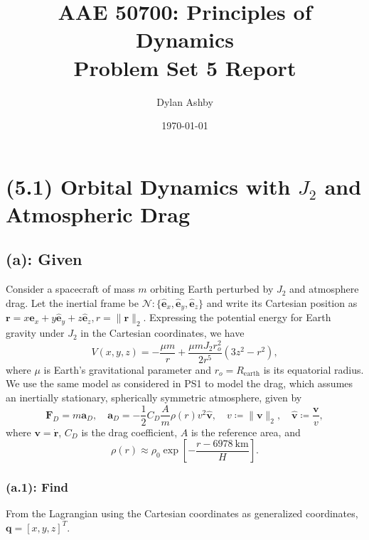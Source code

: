 \documentclass[titlepage]{article}
\title{AAE 50700: Principles of Dynamics\\ Problem Set 5 Report}
\author{Dylan Ashby}
\date{\today}
\begin{document}
\maketitle

\section*{(5.1) Orbital Dynamics with $J_2$ and Atmospheric Drag}

\subsection*{(a): Given}

Consider a spacecraft of mass $m$ orbiting Earth perturbed by $J_2$ and atmosphere drag. Let the inertial frame be $\mathcal{N}:\{\hat{\boldsymbol{e}}_x,\hat{\boldsymbol{e}}_y,\hat{\boldsymbol{e}}_z\}$ and write its Cartesian position as $\boldsymbol{r}=x\hat{\boldsymbol{e}}_x+y\hat{\boldsymbol{e}}_y+z\hat{\boldsymbol{e}}_z,r=\|\boldsymbol{r}\|_2$. Expressing the potential energy for Earth gravity under $J_2$ in the Cartesian coordinates, we have
\begin{equation}
	V(x,y,z)=-\frac{\mu m}{r}+\frac{\mu mJ_2r_o^2}{2r^5}\left(3z^2-r^2\right),
\end{equation}
where $\mu$ is Earth's gravitational parameter and $r_o=R_{\text{earth}}$ is its equatorial radius.\\

We use the same model as considered in PS1 to model the drag, which assumes an inertially stationary, spherically symmetric atmosphere, given by
\begin{equation}
	\boldsymbol{F}_D=m\boldsymbol{a}_D,\quad\boldsymbol{a}_D=-\frac{1}{2}C_D\frac{A}{m}\rho(r)v^2\hat{\boldsymbol{v}},\quad v\coloneqq\|\boldsymbol{v}\|_2,\quad\hat{\boldsymbol{v}}\coloneqq\frac{\boldsymbol{v}}{v},
	\label{eq:dragforce}
\end{equation}
where $\boldsymbol{v}=\dot{\boldsymbol{r}}$, $C_D$ is the drag coefficient, $A$ is the reference area, and
\begin{equation}
	\rho(r) \approx \rho_0 \exp\left[ -\frac{r - 6978~\mathrm{km}}{H} \right].
\end{equation}

\subsubsection*{(a.1): Find}

From the Lagrangian using the Cartesian coordinates as generalized coordinates, $\boldsymbol{q}=[x,y,z]^T$.\\
\end{document}
